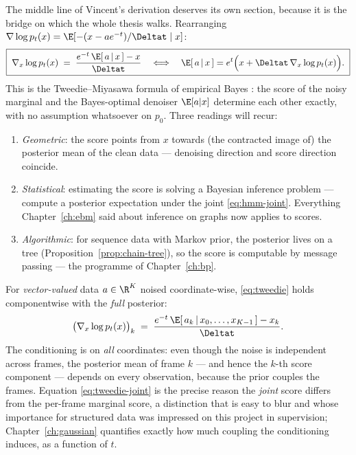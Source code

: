 The middle line of Vincent's derivation deserves its own section, because it
is the bridge on which the whole thesis walks. Rearranging
$\nabla \log p_t(x) = \E[-(x - a e^{-t})/\Deltat \mid x]$:
\begin{equation}
  \boxed{\;
  \nabla_x \log p_t(x)
  \;=\; \frac{e^{-t}\,\E[\,a \,|\, x\,] - x}{\Deltat}
  \quad\Longleftrightarrow\quad
  \E[\,a \,|\, x\,]
  = e^{t} \Big( x + \Deltat\, \nabla_x \log p_t(x) \Big).
  \;}
  \label{eq:tweedie}
\end{equation}
This is the Tweedie--Miyasawa formula of empirical Bayes
\citep{robbins1956empirical, miyasawa1961empirical, efron2011tweedie}:
the score of the noisy marginal and the Bayes-optimal denoiser
$\E[a|x]$ determine each other exactly, with no assumption whatsoever on
$p_0$. Three readings will recur:
\begin{enumerate}
  \item \emph{Geometric}: the score points from $x$ towards (the contracted
  image of) the posterior mean of the clean data --- denoising direction and
  score direction coincide.
  \item \emph{Statistical}: estimating the score is solving a Bayesian
  inference problem --- compute a posterior expectation under the joint
  \eqref{eq:hmm-joint}. Everything Chapter~\ref{ch:ebm} said about
  inference on graphs now applies to scores.
  \item \emph{Algorithmic}: for sequence data with Markov prior, the
  posterior lives on a tree (Proposition~\ref{prop:chain-tree}), so the
  score is computable by message passing --- the programme of
  Chapter~\ref{ch:bp}.
\end{enumerate}

For \emph{vector-valued} data $a \in \R^K$ noised coordinate-wise,
\eqref{eq:tweedie} holds componentwise with the \emph{full} posterior:
\begin{equation}
  \big( \nabla_x \log p_t(x) \big)_k
  \;=\; \frac{e^{-t}\, \E[\,a_k \,|\, x_0, \dots, x_{K-1}\,] - x_k}{\Deltat}.
  \label{eq:tweedie-joint}
\end{equation}
The conditioning is on \emph{all} coordinates: even though the noise is
independent across frames, the posterior mean of frame $k$ --- and hence the
$k$-th score component --- depends on every observation, because the prior
couples the frames. Equation \eqref{eq:tweedie-joint} is the precise reason
the \emph{joint} score differs from the per-frame marginal score, a
distinction that is easy to blur and whose importance for structured data
was impressed on this project in supervision; Chapter~\ref{ch:gaussian}
quantifies exactly how much coupling the conditioning induces, as a function
of $t$.

